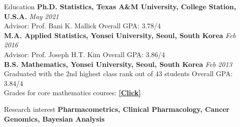 \documentclass{resume} %
\begin{document}

\begin{rSection}{Education}
{\bf Ph.D. Statistics, Texas A\&M University, College Station, U.S.A.} \hfill {\em May 2021} \\ 
Advisor: Prof. Bani K. Mallick
\hfill {Overall GPA: 3.78/4}\\
{\bf M.A. Applied Statistics, Yonsei University, Seoul, South Korea} \hfill {\em Feb 2016} \\ 
Advisor: Prof. Joseph H.T. Kim
\hfill {Overall GPA: 3.86/4}
\\
{\bf B.S. Mathematics, Yonsei University, Seoul, South Korea} \hfill {\em Feb 2013} \\ 
Graduated with the 2nd highest class rank out of 43 students
\hfill {Overall GPA: 3.84/4}\\
{Grades for core mathematics courses:
\href{https://www.dropbox.com/s/jjjwq3e69xloi96/subjects%28math%29.pdf?dl=0}
{\underline{\textbf{[Click]}}}}
\end{rSection}

\begin{rSection}{Research interest}
\textbf{Pharmacometrics, Clinical Pharmacology, Cancer Genomics, Bayesian Analysis}
\end{rSection}

\end{document}
